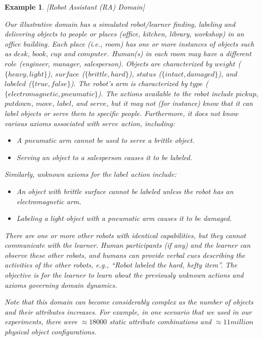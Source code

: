 \documentclass{article}
\newtheorem{example2}{\bf Example}
\newcounter{ctr}
\begin{document}
\begin{example2}\label{ex:illus-example}[Robot Assistant (RA) Domain]
  {\rm Our illustrative domain has a simulated robot/learner finding,
    labeling and delivering objects to people or places (office,
    kitchen, library, workshop) in an office building. Each place
    (i.e., room) has one or more instances of objects such as $desk$,
    $book$, $cup$ and $computer$. Human(s) in each room may have a
    different $role$ (engineer, manager, salesperson). Objects are
    characterized by $weight$ ($\{heavy, light\}$), $surface$
    ($\{brittle, hard\}$), $status$ ($\{intact, damaged\}$), and
    $labeled$ ($\{true, false\}$).  The robot's arm is characterized
    by $type$ ($\{electromagnetic, pneumatic\}$). The actions
    available to the robot include $pickup$, $putdown$, $move$,
    $label$, and $serve$, but it may not (for instance) know that it
    can label objects or serve them to specific people.  Furthermore,
    it does not know various axioms associated with $serve$ action,
    including:
    \begin{itemize}
    \item A pneumatic arm cannot be used to serve a brittle object.
    \item Serving an object to a salesperson causes it to be labeled.
    \end{itemize}
    Similarly, unknown axioms for the $label$ action include:
    \begin{itemize}
    \item An object with brittle surface cannot be labeled unless the
      robot has an electromagnetic arm.
    \item Labeling a light object with a pneumatic arm causes it to be
      damaged.
    \end{itemize}
    There are one or more other robots with identical capabilities,
    but they cannot communicate with the learner. Human participants
    (if any) and the learner can observe these other robots, and
    humans can provide verbal cues describing the activities of the
    other robots, e.g., ``Robot labeled the hard, hefty item''. The
    objective is for the learner to learn about the previously unknown
    actions and axioms governing domain dynamics.

    Note that this domain can become considerably complex as the
    number of objects and their attributes increases. For example, in
    one scenario that we used in our experiments, there were $\approx
    18000$ static attribute combinations and $\approx 11 million$
    physical object configurations.  }
\end{example2}
\end{document}
